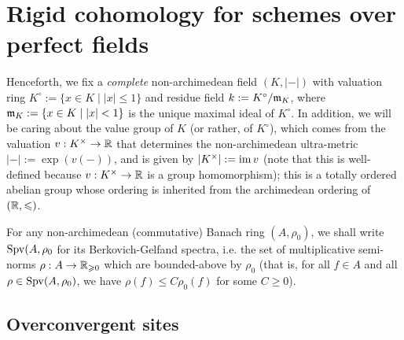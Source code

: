 \section{Rigid cohomology for schemes over perfect fields}
    \begin{convention} \label{conv: rigid_cohomology_non_archimedean_ground_field}
        Henceforth, we fix a \textit{complete} non-archimedean field $(K, |-|)$ with valuation ring $K^{\circ} := \{x \in K \mid |x| \leq 1\}$ and residue field $k := K^{\circ}/\mathfrak{m}_K$, where $\mathfrak{m}_K := \{x \in K \mid |x| < 1\}$ is the unique maximal ideal of $K^{\circ}$. In addition, we will be caring about the value group of $K$ (or rather, of $K^{\circ}$), which comes from the valuation $v: K^{\x} \to \R$ that determines the non-archimedean ultra-metric $|-| := \exp(v(-))$, and is given by $|K^{\x}| := \im v$ (note that this is well-defined because $v: K^{\x} \to \R$ is a group homomorphism); this is a totally ordered abelian group whose ordering is inherited from the archimedean ordering of $(\mathbb{R}, \leqslant)$.
    \end{convention}
    \begin{convention}
        For any non-archimedean (commutative) Banach ring $(A, \rho_0)$, we shall write $\mathrm{Spv}(A, \rho_0$ for its Berkovich-Gelfand spectra, i.e. the set of multiplicative semi-norms $\rho: A \to \mathbb{R}_{\geqslant 0}$ which are bounded-above by $\rho_0$ (that is, for all $f \in A$ and all $\rho \in \mathrm{Spv}(A, \rho_0)$, we have $\rho(f) \leq C \rho_0(f)$ for some $C \geq 0$).
    \end{convention}

    \subsection{Overconvergent sites}
